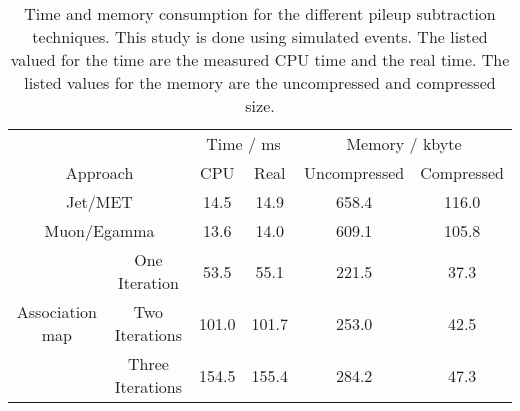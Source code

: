 
\begin{table}[h]
    \begin{center}
        \caption{Time and memory consumption for the different pileup subtraction techniques. This study is done using simulated \ttbar events. The listed valued for the time are the measured CPU time and the real time. The listed values for the memory are the uncompressed and compressed size.}
        \label{tab:OSPTimMemTT}
        
        \begin{tabular}{c c c c c c}
            & & \multicolumn{2}{c}{Time / ms} & \multicolumn{2}{c}{Memory / kbyte}  \\
            \multicolumn{2}{c}{Approach} & CPU & Real & Uncompressed & Compressed \\
            \midrule[2pt]
            \multicolumn{2}{c}{Jet/MET}  & 14.5 & 14.9 & 658.4  & 116.0 \\
            \midrule
            \multicolumn{2}{c}{Muon/Egamma}  & 13.6 & 14.0 & 609.1 & 105.8 \\
            \midrule
            \multirow{3}{*}{Association map}
            & One Iteration & 53.5 & 55.1 & 221.5 & 37.3 \\
            \cmidrule{2-6}
            & Two Iterations & 101.0 & 101.7 & 253.0 & 42.5 \\
            \cmidrule{2-6}
            & Three Iterations  & 154.5 & 155.4 & 284.2 & 47.3 \\
            
        \end{tabular}
        
    \end{center}
\end{table}